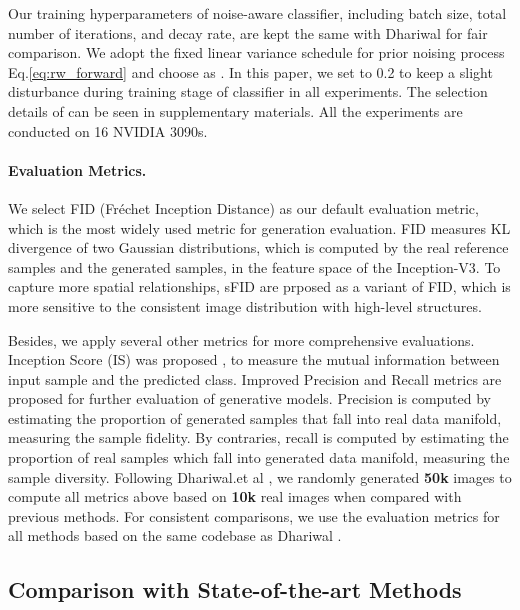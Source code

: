 \documentclass[runningheads]{llncs}
\begin{document}
Our training hyperparameters of noise-aware classifier, including batch size, total number of iterations, and decay rate, are kept the same with Dhariwal \etal \cite{dhariwal2021diffusion} for fair comparison.
We adopt the fixed linear variance schedule  \cite{nichol2021improved,ho2020denoising} for prior noising process Eq.\eqref{eq:rw_forward} and choose  as .
In this paper, we set  to 0.2 to keep a slight disturbance during training stage of classifier in all experiments. 
The selection details of  can be seen in supplementary materials.
All the experiments are conducted on 16 NVIDIA 3090s.



\paragraph{\textbf{Evaluation Metrics.}}

We select FID (Fréchet Inception Distance) \cite{fid} as our default evaluation metric, which is the most widely used metric for generation evaluation.
FID \cite{fid} measures KL divergence of two Gaussian distributions, which is computed by the real reference samples and the generated samples, in the feature space of the Inception-V3. 
To capture more spatial relationships, sFID are prposed as a variant of FID, which is more sensitive to the consistent image distribution with high-level structures.

Besides, we apply several other metrics
for more comprehensive evaluations.
Inception Score (IS) was proposed \cite{noteoninceptionscore},
to measure the mutual information between input sample and the predicted class.
Improved Precision and Recall metrics are proposed \cite{precrecall} for further evaluation of generative models.
Precision is computed by estimating the proportion of generated samples that fall into real data manifold, measuring the sample fidelity.
By contraries, recall is computed by estimating the proportion of real samples which fall into generated data manifold, measuring the sample diversity.
Following Dhariwal.et al \cite{dhariwal2021diffusion}, we randomly generated \textbf{50k} images to compute all metrics above based on \textbf{10k} real images when compared with previous methods.
For consistent comparisons, we use the evaluation metrics for all methods based on the same codebase as Dhariwal \etal \cite{dhariwal2021diffusion}.



\subsection{Comparison with State-of-the-art Methods}
\end{document}
